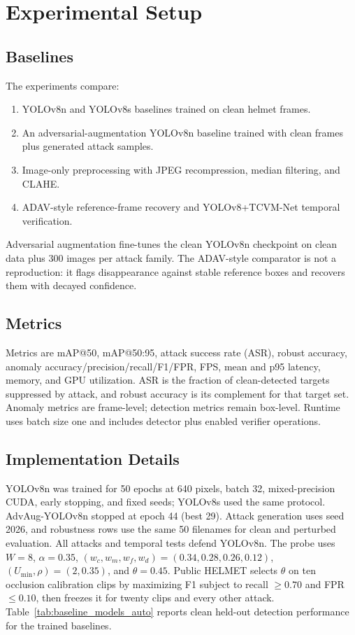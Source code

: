 \documentclass[runningheads,a4paper]{llncs}
\newcommand{\method}{TCVM-Net}
\begin{document}
\section{Experimental Setup}

\subsection{Baselines}
The experiments compare:
\begin{enumerate}
    \item YOLOv8n and YOLOv8s baselines trained on clean helmet frames.
    \item An adversarial-augmentation YOLOv8n baseline trained with clean frames plus generated attack samples.
    \item Image-only preprocessing with JPEG recompression, median filtering, and CLAHE.
    \item ADAV-style reference-frame recovery and YOLOv8+\method{} temporal verification.
\end{enumerate}
Adversarial augmentation fine-tunes the clean YOLOv8n checkpoint on clean data plus 300 images per attack family. The ADAV-style comparator is not a reproduction: it flags disappearance against stable reference boxes and recovers them with decayed confidence.

\subsection{Metrics}
Metrics are mAP@50, mAP@50:95, attack success rate (ASR), robust accuracy, anomaly accuracy/precision/recall/F1/FPR, FPS, mean and p95 latency, memory, and GPU utilization. ASR is the fraction of clean-detected targets suppressed by attack, and robust accuracy is its complement for that target set. Anomaly metrics are frame-level; detection metrics remain box-level. Runtime uses batch size one and includes detector plus enabled verifier operations.

\subsection{Implementation Details}
YOLOv8n was trained for 50 epochs at 640 pixels, batch 32, mixed-precision CUDA, early stopping, and fixed seeds; YOLOv8s used the same protocol. AdvAug-YOLOv8n stopped at epoch 44 (best 29). Attack generation uses seed 2026, and robustness rows use the same 50 filenames for clean and perturbed evaluation. All attacks and temporal tests defend YOLOv8n. The probe uses $W=8$, $\alpha=0.35$, $(w_c,w_m,w_f,w_d)=(0.34,0.28,0.26,0.12)$, $(U_{\min},\rho)=(2,0.35)$, and $\theta=0.45$. Public HELMET selects $\theta$ on ten occlusion calibration clips by maximizing F1 subject to recall $\geq0.70$ and FPR $\leq0.10$, then freezes it for twenty clips and every other attack. Table~\ref{tab:baseline_models_auto} reports clean held-out detection performance for the trained baselines.
\end{document}
